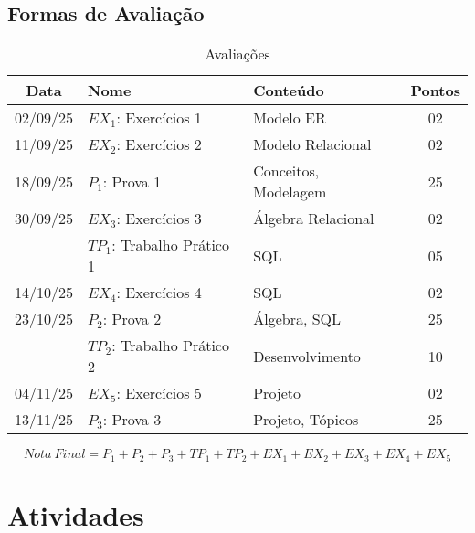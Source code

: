 \documentclass[12pt, a4paper]{article}
\begin{document}
\subsection{Formas de Avaliação} \label{subsec:avaliacoes}

\begin{table}[!htbp] \centering \caption{Avaliações} \label{tab:Avaliacoes}
    \begin{tabular}{|c|l|l|c|}
    \hline
        Data                 & Nome                        & Conteúdo               & Pontos \\ \hline
        02/09/25             & $EX_1$: Exercícios 1        & Modelo ER              & 02     \\ \hline
        11/09/25             & $EX_2$: Exercícios 2        & Modelo Relacional      & 02     \\ \hline
        18/09/25             & $P_1$: Prova 1              & Conceitos, Modelagem   & 25     \\ \hline
        30/09/25             & $EX_3$: Exercícios 3        & Álgebra Relacional     & 02     \\ \hline
        [09/10/25, 22/10/25] & $TP_1$: Trabalho Prático 1  & SQL                    & 05     \\ \hline
        14/10/25             & $EX_4$: Exercícios 4        & SQL                    & 02     \\ \hline
        23/10/25             & $P_2$: Prova 2              & Álgebra, SQL           & 25     \\ \hline
        [28/10/25, 24/11/25] & $TP_2$: Trabalho Prático 2  & Desenvolvimento        & 10     \\ \hline
        04/11/25             & $EX_5$: Exercícios 5        & Projeto                & 02     \\ \hline
        13/11/25             & $P_3$: Prova 3              & Projeto, Tópicos       & 25     \\ \hline
    \end{tabular}
\end{table}

$$Nota\ Final = P_1 + P_2 + P_3 + TP_1 + TP_2 + EX_1 + EX_2 + EX_3 + EX_4 + EX_5$$



\section{Atividades} \label{sec:atividades}
\end{document}
